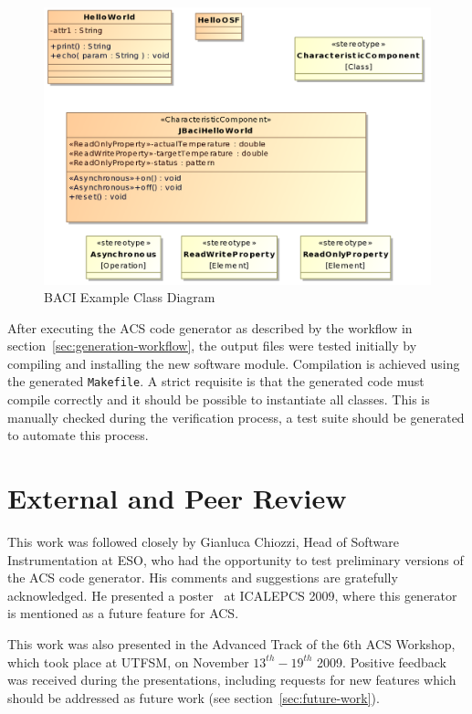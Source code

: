 \begin{figure}
  \begin{center}
  \includegraphics[width=\textwidth]{images/example-classdiagram.png}
  \end{center}
  \caption{BACI Example Class Diagram}
  \label{fg:BACIClassDiagram}
\end{figure}

After executing the ACS code generator as described by the workflow in
section~\ref{sec:generation-workflow},
the output files were tested initially by compiling and installing
the new software module.
Compilation is achieved using the generated \lstinline[language=sh]!Makefile!.
A strict requisite is that the generated code must
compile correctly and it should be possible to instantiate all classes.
This is manually checked during the verification process,
a test suite should be generated to automate this process.

\section{External and Peer Review}
\label{sec:external-review}
This work was followed closely by Gianluca Chiozzi,
Head of Software Instrumentation at ESO,
who had the opportunity to test preliminary versions of
the ACS code generator.
His comments and suggestions are gratefully acknowledged.
He presented a poster~\cite{chiozzi09:_acs_status} at
ICALEPCS 2009, where this generator is mentioned as
a future feature for ACS.

This work was also presented in the Advanced Track of
the 6th ACS Workshop,
which took place at UTFSM, on November $13^{th}-19^{th}$ 2009.
Positive feedback was received during
the presentations, including requests for new features which
should be addressed as future work (see section~\ref{sec:future-work}).

